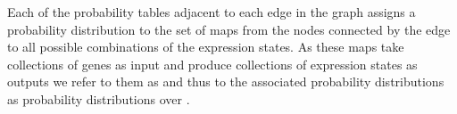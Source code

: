 Each of the probability tables adjacent to each edge in the graph assigns a probability distribution to the set of maps from the nodes connected by the edge to all possible combinations of the expression states. As these maps take collections of genes as input and produce collections of expression states as outputs we refer to them as \gnpm{} and thus to the associated probability distributions as probability distributions over \gnpm{}.

